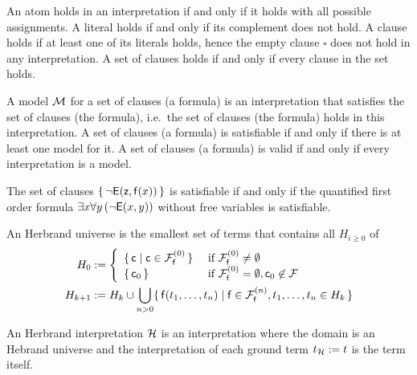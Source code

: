 \begin{definition}\label{def:semantics:CNF}
	An atom holds in an interpretation if and only if it 
	holds with all possible assignments. 
	A literal holds if and only if its complement does not hold.
	A clause holds if at least one of its literals holds,
	hence the empty clause $\square$ does not hold in any interpretation.
	A set of clauses holds if and only if every clause in the set holds.
\end{definition}

\begin{definition}
	A {\myem model} ${\mathcal M}$ for a set of clauses (a formula) is an interpretation that 
	{\myem satisfies} the set of clauses (the formula),
	i.e.~the set of clauses (the formula) holds in this interpretation.
	A set of clauses (a formula) is {\myem satisfiable} if and only if there is at least one model for it. 
	A set of clauses (a formula) is {\myem valid} if and only if every interpretation is a model.
\end{definition}

\begin{example}
	The set of clauses $\{\,\lnot{\mathsf{E}}({\mathsf z}, {\mathsf f}(x))\,\}$ is satisfiable if and only if the quantified first order formula $\exists x \forall y\,(\lnot {\mathsf{E}}(x,y))$ without free variables is satisfiable.
\end{example}

\begin{definition}\label{def:hk}
	An {\myem Herbrand universe} is the smallest set of terms that contains all $H_{i\geq 0}$ of
	\begin{align*}
	H_0 &:= \left\{ 
	\begin{array}{ll}
	\{\,\mc \mid \mc\in\mcFfn[0]\,\} 
	&\text{if } \mcFfn[0]\not=\emptyset\\
	\{\,\mc_0\,\}
	&\text{if } \mcFfn[0]=\emptyset, \mc_0\not\in\mcF
	\end{array}
	\right. 
	\\
	H_{k+1} &:= H_k \cup \bigcup_{n> 0} 
	\{\,  
	\mf(t_1,\ldots,t_n) \mid
	\mf\in\mcFfn[n],
	t_1,\ldots,t_n \in H_k
	\,\}
	\end{align*}
	
\end{definition}

\begin{definition}
	An {\myem Herbrand interpretation} ${\mathcal H}$ is an interpretation where the domain 
	is an Hebrand universe
	and the interpretation of each ground term $t_{\mathcal H} := t$ is the term itself.
\end{definition}

